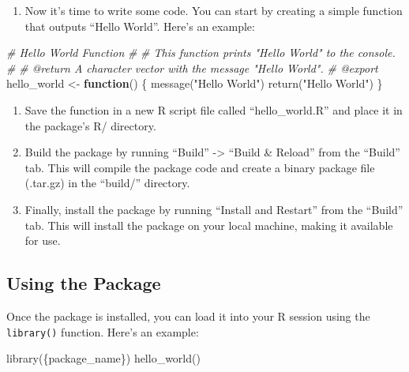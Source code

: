 \documentclass[
]{book}
\newenvironment{Shaded}{\begin{snugshade}}{\end{snugshade}}
\newcommand{\CommentTok}[1]{\textcolor[rgb]{0.56,0.35,0.01}{\textit{#1}}}
\newcommand{\ControlFlowTok}[1]{\textcolor[rgb]{0.13,0.29,0.53}{\textbf{#1}}}
\newcommand{\FunctionTok}[1]{\textcolor[rgb]{0.00,0.00,0.00}{#1}}
\newcommand{\NormalTok}[1]{#1}
\newcommand{\OtherTok}[1]{\textcolor[rgb]{0.56,0.35,0.01}{#1}}
\newcommand{\StringTok}[1]{\textcolor[rgb]{0.31,0.60,0.02}{#1}}
\providecommand{\tightlist}{%
  \setlength{\itemsep}{0pt}\setlength{\parskip}{0pt}}
\begin{document}
\begin{enumerate}
\def\labelenumi{\arabic{enumi}.}
\tightlist
\item
  Now it's time to write some code. You can start by creating a simple function that outputs ``Hello World''. Here's an example:
\end{enumerate}

\begin{Shaded}
\begin{Highlighting}[]
\CommentTok{\#\textquotesingle{} Hello World Function}
\CommentTok{\#\textquotesingle{}}
\CommentTok{\#\textquotesingle{} This function prints "Hello World" to the console.}
\CommentTok{\#\textquotesingle{}}
\CommentTok{\#\textquotesingle{} @return A character vector with the message "Hello World".}
\CommentTok{\#\textquotesingle{} @export}
\NormalTok{hello\_world }\OtherTok{\textless{}{-}} \ControlFlowTok{function}\NormalTok{() \{}
  \FunctionTok{message}\NormalTok{(}\StringTok{"Hello World"}\NormalTok{)}
  \FunctionTok{return}\NormalTok{(}\StringTok{"Hello World"}\NormalTok{)}
\NormalTok{\}}
\end{Highlighting}
\end{Shaded}

\begin{enumerate}
\def\labelenumi{\arabic{enumi}.}
\tightlist
\item
  Save the function in a new R script file called ``hello\_world.R'' and place it in the package's R/ directory.
\item
  Build the package by running ``Build'' -\textgreater{} ``Build \& Reload'' from the ``Build'' tab. This will compile the package code and create a binary package file (.tar.gz) in the ``build/'' directory.
\item
  Finally, install the package by running ``Install and Restart'' from the ``Build'' tab. This will install the package on your local machine, making it available for use.
\end{enumerate}

\hypertarget{using-the-package}{%
\subsection{Using the Package}\label{using-the-package}}

Once the package is installed, you can load it into your R session using the \texttt{library()} function. Here's an example:

\begin{Shaded}
\begin{Highlighting}[]
\FunctionTok{library}\NormalTok{(\{package\_name\})}
\FunctionTok{hello\_world}\NormalTok{()}
\end{Highlighting}
\end{Shaded}
\end{document}
